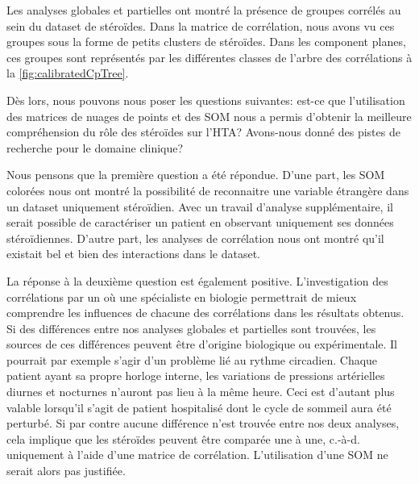 
	Les analyses globales et partielles ont montré la présence de groupes corrélés au sein du dataset de stéroïdes. Dans la matrice de corrélation, nous avons vu ces groupes sous la forme de petits clusters de stéroïdes. Dans les component planes, ces groupes sont représentés par les différentes classes de l'arbre des corrélations à la \autoref{fig:calibratedCpTree}. 

	Dès lors, nous pouvons nous poser les questions suivantes: est-ce que l'utilisation des matrices de nuages de points et des SOM nous a permis d'obtenir la meilleure compréhension du rôle des stéroïdes sur l'HTA? Avons-nous donné des pistes de recherche pour le domaine clinique?

	Nous pensons que la première question a été répondue. D'une part, les SOM colorées nous ont montré la possibilité de reconnaitre une variable étrangère dans un dataset uniquement stéroïdien. Avec un travail d'analyse supplémentaire, il serait possible de caractériser un patient en observant uniquement ses données stéroïdiennes. D'autre part, les analyses de corrélation nous ont montré qu'il existait bel et bien des interactions dans le dataset. 

	La réponse à la deuxième question est également positive. L'investigation des corrélations par un où une spécialiste en biologie permettrait de mieux comprendre les influences de chacune des corrélations dans les résultats obtenus. Si des différences entre nos analyses globales et partielles sont trouvées, les sources de ces différences peuvent être d'origine biologique ou expérimentale. Il pourrait par exemple s'agir d'un problème lié au rythme circadien. Chaque patient ayant sa propre horloge interne, les variations de pressions artérielles diurnes et nocturnes n'auront pas lieu à la même heure. Ceci est d'autant plus valable lorsqu'il s'agit de patient hospitalisé dont le cycle de sommeil aura été perturbé. Si par contre aucune différence n'est trouvée entre nos deux analyses, cela implique que les stéroïdes peuvent être comparée une à une, c.-à-d. uniquement à l'aide d'une matrice de corrélation. L'utilisation d'une SOM ne serait alors pas justifiée.



